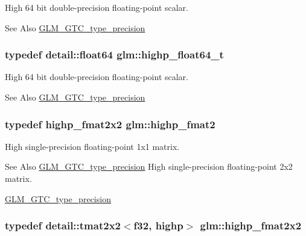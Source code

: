 High 64 bit double-\/precision floating-\/point scalar. \begin{DoxySeeAlso}{See Also}
\hyperlink{group__gtc__type__precision}{G\-L\-M\-\_\-\-G\-T\-C\-\_\-type\-\_\-precision} 
\end{DoxySeeAlso}
\hypertarget{group__gtc__type__precision_gae8b3b2ace5be2a61c6bf63f12643fa15}{
\subsubsection[{highp\-\_\-float64\-\_\-t}]{\setlength{\rightskip}{0pt plus 5cm}typedef detail\-::float64 {\bf glm\-::highp\-\_\-float64\-\_\-t}}}\label{group__gtc__type__precision_gae8b3b2ace5be2a61c6bf63f12643fa15}
High 64 bit double-\/precision floating-\/point scalar. \begin{DoxySeeAlso}{See Also}
\hyperlink{group__gtc__type__precision}{G\-L\-M\-\_\-\-G\-T\-C\-\_\-type\-\_\-precision} 
\end{DoxySeeAlso}
\hypertarget{group__gtc__type__precision_ga10d47be18a81c111a8706d0a6df5b4ea}{
\subsubsection[{highp\-\_\-fmat2}]{\setlength{\rightskip}{0pt plus 5cm}typedef highp\-\_\-fmat2x2 {\bf glm\-::highp\-\_\-fmat2}}}\label{group__gtc__type__precision_ga10d47be18a81c111a8706d0a6df5b4ea}
High single-\/precision floating-\/point 1x1 matrix. \begin{DoxySeeAlso}{See Also}
\hyperlink{group__gtc__type__precision}{G\-L\-M\-\_\-\-G\-T\-C\-\_\-type\-\_\-precision} High single-\/precision floating-\/point 2x2 matrix. 

\hyperlink{group__gtc__type__precision}{G\-L\-M\-\_\-\-G\-T\-C\-\_\-type\-\_\-precision} 
\end{DoxySeeAlso}
\hypertarget{group__gtc__type__precision_gaeb76f1230ecfd4c80635d3c618405e31}{
\subsubsection[{highp\-\_\-fmat2x2}]{\setlength{\rightskip}{0pt plus 5cm}typedef detail\-::tmat2x2$<$f32, highp$>$ {\bf glm\-::highp\-\_\-fmat2x2}}}\label{group__gtc__type__precision_gaeb76f1230ecfd4c80635d3c618405e31}
